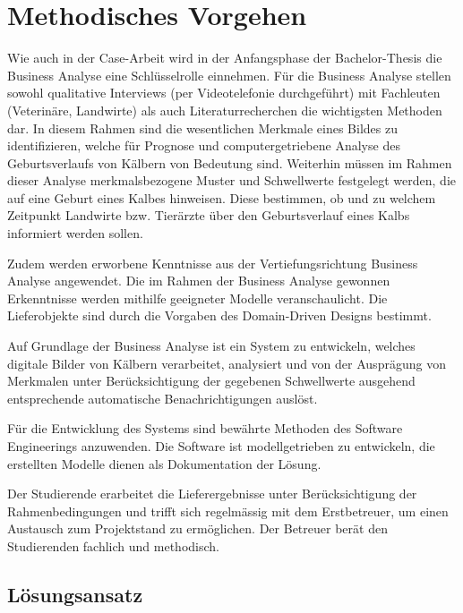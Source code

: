\chapter{Methodisches Vorgehen}

Wie auch in der Case-Arbeit wird in der Anfangsphase der Bachelor-Thesis die Business Analyse eine Schlüsselrolle einnehmen. Für die Business Analyse stellen sowohl qualitative Interviews (per Videotelefonie durchgeführt) mit Fachleuten (Veterinäre, Landwirte) als auch Literaturrecherchen die wichtigsten Methoden dar.  In diesem Rahmen sind die wesentlichen Merkmale eines Bildes zu identifizieren, welche für Prognose und computergetriebene Analyse des Geburtsverlaufs von Kälbern von Bedeutung sind.  Weiterhin müssen im Rahmen dieser Analyse merkmalsbezogene Muster und Schwellwerte festgelegt werden, die auf eine Geburt eines Kalbes hinweisen. Diese bestimmen, ob und zu welchem Zeitpunkt Landwirte bzw. Tierärzte über den Geburtsverlauf eines Kalbs informiert werden sollen. 

Zudem werden erworbene Kenntnisse aus der Vertiefungsrichtung Business Analyse angewendet.  Die im Rahmen der Business Analyse gewonnen Erkenntnisse werden mithilfe geeigneter Modelle veranschaulicht. Die Lieferobjekte sind durch die Vorgaben des Domain-Driven Designs bestimmt. 

Auf Grundlage der Business Analyse ist ein System zu entwickeln, welches digitale Bilder von Kälbern verarbeitet, analysiert und von der Ausprägung von Merkmalen unter Berücksichtigung der gegebenen Schwellwerte ausgehend entsprechende automatische Benachrichtigungen auslöst. 

Für die Entwicklung des Systems sind bewährte Methoden des Software Engineerings anzuwenden. Die Software ist modellgetrieben zu entwickeln, die erstellten Modelle dienen als Dokumentation der Lösung.

Der Studierende erarbeitet die Lieferergebnisse unter Berücksichtigung der Rahmenbedingungen und trifft sich regelmässig mit dem Erstbetreuer, um einen Austausch zum Projektstand zu ermöglichen. Der Betreuer berät den Studierenden fachlich und methodisch.

\section{Lösungsansatz}

